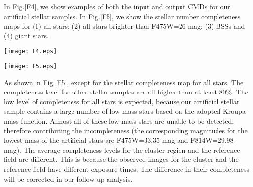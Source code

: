 \documentclass[useAMS,usenatbib,twocolumn]{mnras}
\begin{document}
In Fig.\ref{F4}, we show examples of both the input and output CMDs for our artificial stellar samples. In Fig.\ref{F5}, we show the stellar number completeness maps for (1) all stars; (2) all stars brighter than F475W=26 mag; (3) BSSs and (4) giant stars. 

\begin{figure*}
  \centering
  \texttt{[image: F4.eps]}
  \caption{Left panel: The input CMD of artificial stars. The young MS branch represents the sample of artificial BSSs. Right panel: The output CMD of artificial stars based on our selection criteria. We only exhibit a small fraction of our artificial stars ($\sim$20,000) to avoid the overload of image space.}\label{F4}
\end{figure*}

\begin{figure*}
  \centering
  \texttt{[image: F5.eps]}
  \caption{The stellar completeness map for all stars (top-left), all stars brighter than F475W=26 mag (top-right), BSSs (bottom-left) and giant stars (bottom-right)}\label{F5}
\end{figure*}

As shown in Fig.\ref{F5}, except for the stellar completeness map for all stars. The completeness level for other stellar samples are all higher than at least 80\%. The low level of completeness for all stars is expected, because our artificial stellar sample contains a large number of low-mass stars based on the adopted Kroupa mass function. Almost all of these low-mass stars are unable to be detected, therefore contributing the incompleteness (the corresponding magnitudes for the lowest mass of the artificial stars are F475W=33.35 mag and F814W=29.98 mag). The average completeness levels for the cluster region and the reference field are different. This is because the observed images for the cluster and the reference field have different exposure times. The difference in their completeness will be corrected in our follow up analysis.
\end{document}
